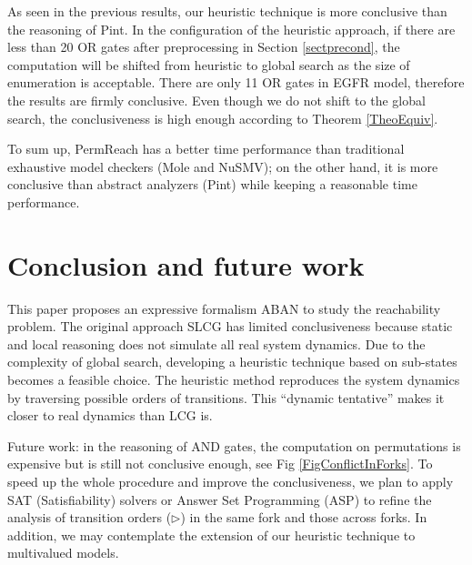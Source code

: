 \documentclass[runningheads]{llncs}
\begin{document}
As seen in the previous results, our heuristic technique is more conclusive than the reasoning of Pint. In the configuration of the heuristic approach, if there are less than 20 OR gates after preprocessing in Section \ref{sectprecond}, the computation will be shifted from heuristic to global search as the size of enumeration is acceptable. There are only 11 OR gates in EGFR model, therefore the results are firmly conclusive. Even though we do not shift to the global search, the conclusiveness is high enough according to Theorem \ref{TheoEquiv}.

To sum up, PermReach has a better time performance than traditional exhaustive model checkers (Mole and NuSMV); on the other hand, it is more conclusive than abstract analyzers (Pint) while keeping a reasonable time performance.

\section{Conclusion and future work}\label{sect:6}
This paper proposes an expressive formalism ABAN to study the reachability problem. The original approach SLCG has limited conclusiveness because static and local reasoning does not simulate all real system dynamics. Due to the complexity of global search, developing a heuristic technique based on sub-states becomes a feasible choice. The heuristic method reproduces the system dynamics by traversing possible orders of transitions. This ``dynamic tentative'' makes it closer to real dynamics than LCG is.

Future work: in the reasoning of AND gates, the computation on permutations is expensive but is still not conclusive enough, see Fig \ref{FigConflictInForks}. To speed up the whole procedure and improve the conclusiveness, we plan to apply SAT (Satisfiability) solvers or Answer Set Programming (ASP) to refine the analysis of transition orders ($\triangleright$) in the same fork and those across forks. In addition, we may contemplate the extension of our heuristic technique to multivalued models.
\appendix
\end{document}
